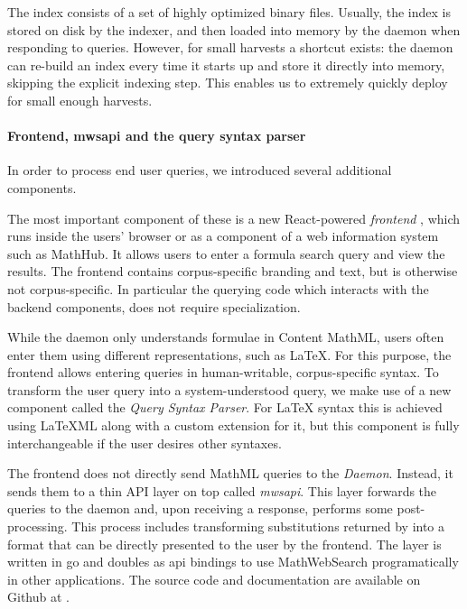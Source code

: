 The index consists of a set of highly optimized binary files. 
Usually, the index is stored on disk by the indexer, and then loaded into memory by the \MWS daemon when responding to queries. 
However, for small harvests a shortcut exists: the \MWS daemon can re-build an index every time it starts up and store it directly into memory, skipping the explicit indexing step. 
This enables us to extremely quickly deploy \MWS for small enough harvests. 
\paragraph{Frontend, mwsapi and the query syntax parser}

In order to process end user queries, we introduced several additional components.

The most important component of these is a new React-powered \textit{frontend} \cite{mwsfrontend:github:on}, which runs inside the users' browser or as a component of a web information system such as MathHub. 
It allows users to enter a formula search query and view the results. 
The frontend contains corpus-specific branding and text, but is otherwise not corpus-specific. 
In particular the querying code which interacts with the backend components, does not require specialization. 

While the \MWS daemon only understands formulae in Content MathML, users often enter them using different representations, such as \LaTeX. 
For this purpose, the frontend allows entering queries in human-writable, corpus-specific syntax. 
To transform the user query into a system-understood query, we make use of a new component called the \textit{Query Syntax Parser}. 
For {\LaTeX} syntax this is achieved using {\LaTeX}ML \cite{Miller:latexml:online} along with a custom \MWS extension for it\cite{latexml-stex:github:on}, but this component is fully interchangeable if the user desires other syntaxes. 

The frontend does not directly send MathML queries to the \textit{Daemon}.
Instead, it sends them to a thin API layer on top called \textit{mwsapi}. 
This layer forwards the queries to the daemon and, upon receiving a response, performs some post-processing. 
This process includes transforming substitutions returned by \MWS into a format that can be directly presented to the user by the frontend. 
The layer is written in go and doubles as api bindings to use MathWebSearch programatically in other applications. 
The source code and documentation are available on Github at \cite{mwsapi:github:on}. 

